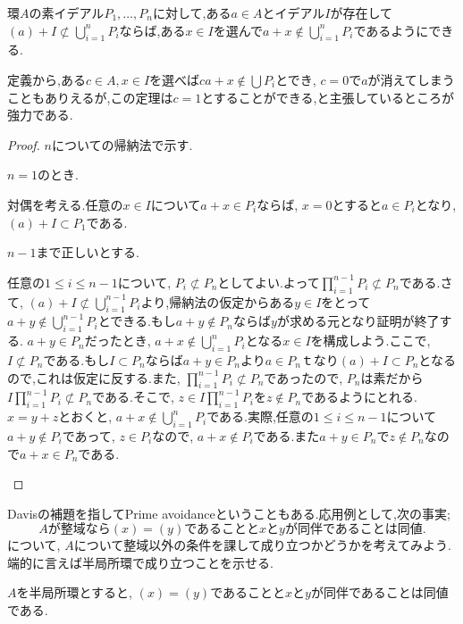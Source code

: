 \begin{thm}[Davisの補題]\label{thm:Davisの補題}
	環$A$の素イデアル$P_1,\dots,P_n$に対して,ある$a\in A$とイデアル$I$が存在して$(a)+I\not\subset\bigcup_{i=1}^n P_i$ならば,ある$x\in I$を選んで$a+x\not\in\bigcup_{i=1}^n P_i$であるようにできる.
\end{thm}

定義から,ある$c\in A,x\in I$を選べば$ca+x\not\in\bigcup P_i$とでき, $c=0$で$a$が消えてしまうこともありえるが,この定理は$c=1$とすることができる,と主張しているところが強力である.

\begin{proof}
	$n$についての帰納法で示す.
	
	\begin{step}
		\item $n=1$のとき.
		
		対偶を考える.任意の$x\in I$について$a+x\in P_i$ならば, $x=0$とすると$a\in P_i$となり, $(a)+I\subset P_1$である.
		
		\item $n-1$まで正しいとする.
		
		任意の$1\leq i\leq n-1$について, $P_i\not\subset P_n$としてよい.よって$\prod_{i=1}^{n-1}P_i\not\subset P_n$である.さて, $(a)+I\not\subset\bigcup_{i=1}^{n-1}P_i$より,帰納法の仮定からある$y\in I$をとって$a+y\not\in\bigcup_{i=1}^{n-1}P_i$とできる.もし$a+y\not\in P_n$ならば$y$が求める元となり証明が終了する. $a+y\in P_n$だったとき, $a+x\not\in \bigcup_{i=1}^n P_i$となる$x\in I$を構成しよう.ここで, $I\not\subset P_n$である.もし$I\subset P_n$ならば$a+y\in P_n$より$a\in P_n$ｔなり$(a)+I\subset P_n$となるので,これは仮定に反する.また, $\prod_{i=1}^{n-1}P_i\not\subset P_n$であったので, $P_n$は素だから$I\prod_{i=1}^{n-1}P_i\not\subset P_n$である.そこで, $z\in I\prod_{i=1}^{n-1}P_i$を$z\not\in P_n$であるようにとれる. $x=y+z$とおくと, $a+x\not\in\bigcup_{i=1}^n P_i$である.実際,任意の$1\leq i\leq n-1$について$a+y\not\in P_i$であって, $z\in P_i$なので, $a+x\not\in P_i$である.また$a+y\in P_n$で$z\not\in P_n$なので$a+x\in P_n$である.	
	\end{step}
\end{proof}

Davisの補題を指してPrime avoidanceということもある.応用例として,次の事実;
\[A\text{が整域なら}(x)=(y)\text{であることと}x\text{と}y\text{が同伴であることは同値.}\]
について, $A$について整域以外の条件を課して成り立つかどうかを考えてみよう.端的に言えば半局所環で成り立つことを示せる.

\begin{prop}\label{prop:半局所環と同伴関係}
	$A$を半局所環とすると, $(x)=(y)$であることと$x$と$y$が同伴であることは同値である.
\end{prop}

